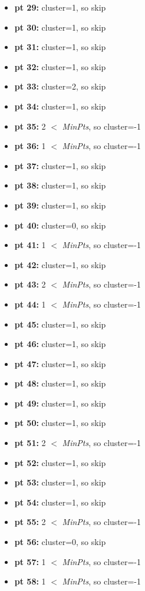 \documentclass[11pt]{article}
\begin{document}
\begin{itemize}[label=$\star$]
			\item \textbf{pt 29:} cluster=1, so skip
			\item \textbf{pt 30:} cluster=1, so skip
			\item \textbf{pt 31:} cluster=1, so skip
			\item \textbf{pt 32:} cluster=1, so skip
			\item \textbf{pt 33:} cluster=2, so skip
			\item \textbf{pt 34:} cluster=1, so skip
			\item \textbf{pt 35:} 2 $<$ \textit{MinPts}, so cluster=-1
			\item \textbf{pt 36:} 1 $<$ \textit{MinPts}, so cluster=-1
			\item \textbf{pt 37:} cluster=1, so skip
			\item \textbf{pt 38:} cluster=1, so skip
			\item \textbf{pt 39:} cluster=1, so skip
			\item \textbf{pt 40:} cluster=0, so skip
			\item \textbf{pt 41:} 1 $<$ \textit{MinPts}, so cluster=-1
			\item \textbf{pt 42:} cluster=1, so skip
			\item \textbf{pt 43:} 2 $<$ \textit{MinPts}, so cluster=-1
			\item \textbf{pt 44:} 1 $<$ \textit{MinPts}, so cluster=-1
			\item \textbf{pt 45:} cluster=1, so skip
			\item \textbf{pt 46:} cluster=1, so skip
			\item \textbf{pt 47:} cluster=1, so skip
			\item \textbf{pt 48:} cluster=1, so skip
			\item \textbf{pt 49:} cluster=1, so skip
			\item \textbf{pt 50:} cluster=1, so skip
			\item \textbf{pt 51:} 2 $<$ \textit{MinPts}, so cluster=-1
			\item \textbf{pt 52:} cluster=1, so skip
			\item \textbf{pt 53:} cluster=1, so skip
			\item \textbf{pt 54:} cluster=1, so skip
			\item \textbf{pt 55:} 2 $<$ \textit{MinPts}, so cluster=-1
			\item \textbf{pt 56:} cluster=0, so skip
			\item \textbf{pt 57:} 1 $<$ \textit{MinPts}, so cluster=-1
			\item \textbf{pt 58:} 1 $<$ \textit{MinPts}, so cluster=-1

\end{itemize}
\end{document}
